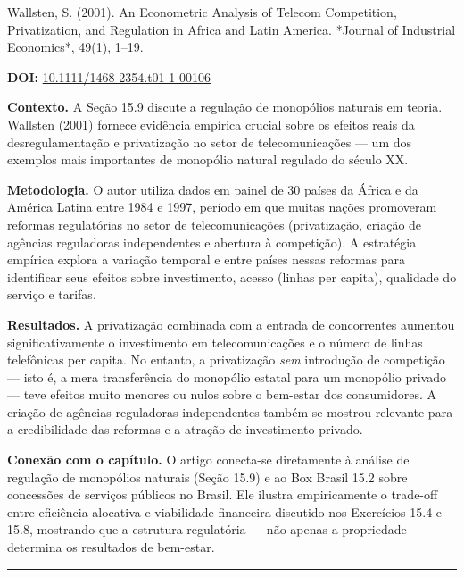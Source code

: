 \documentclass[11pt,twoside,openright]{book}
\begin{document}
\begin{pesquisabox}{Wallsten, S. (2001). An Econometric Analysis of Telecom Competition, Privatization, and Regulation in Africa and Latin America. *Journal of Industrial Economics*, 49(1), 1–19.}

\textbf{DOI:}
\href{https://doi.org/10.1111/1468-2354.t01-1-00106}{10.1111/1468-2354.t01-1-00106}

\textbf{Contexto.} A Seção 15.9 discute a regulação de monopólios
naturais em teoria. Wallsten (2001) fornece evidência empírica crucial
sobre os efeitos reais da desregulamentação e privatização no setor de
telecomunicações --- um dos exemplos mais importantes de monopólio
natural regulado do século XX.

\textbf{Metodologia.} O autor utiliza dados em painel de 30 países da
África e da América Latina entre 1984 e 1997, período em que muitas
nações promoveram reformas regulatórias no setor de telecomunicações
(privatização, criação de agências reguladoras independentes e abertura
à competição). A estratégia empírica explora a variação temporal e entre
países nessas reformas para identificar seus efeitos sobre investimento,
acesso (linhas per capita), qualidade do serviço e tarifas.

\textbf{Resultados.} A privatização combinada com a entrada de
concorrentes aumentou significativamente o investimento em
telecomunicações e o número de linhas telefônicas per capita. No
entanto, a privatização \emph{sem} introdução de competição --- isto é,
a mera transferência do monopólio estatal para um monopólio privado ---
teve efeitos muito menores ou nulos sobre o bem-estar dos consumidores.
A criação de agências reguladoras independentes também se mostrou
relevante para a credibilidade das reformas e a atração de investimento
privado.

\textbf{Conexão com o capítulo.} O artigo conecta-se diretamente à
análise de regulação de monopólios naturais (Seção 15.9) e ao Box Brasil
15.2 sobre concessões de serviços públicos no Brasil. Ele ilustra
empiricamente o trade-off entre eficiência alocativa e viabilidade
financeira discutido nos Exercícios 15.4 e 15.8, mostrando que a
estrutura regulatória --- não apenas a propriedade --- determina os
resultados de bem-estar.

\end{pesquisabox}

\begin{center}\rule{0.5\linewidth}{0.5pt}\end{center}
\end{document}
